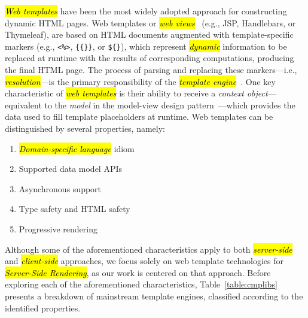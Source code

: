 \documentclass[software,article,accept,pdftex,moreauthors]{Definitions/mdpi}
\begin{document}
\textit{\hl{Web templates}} have been the most widely adopted approach for
constructing dynamic HTML pages.
Web templates or \textit{\hl{web views}}~\cite{Fowler02,Alur01} (e.g., JSP, Handlebars,
or Thymeleaf), are based on HTML documents augmented with template-specific
markers (e.g., \texttt{<\%>}, \texttt{\{\{\}\}}, or \texttt{\$\{\}}), which
represent \textit{\hl{dynamic}} information to be replaced at runtime with the
results of corresponding computations, producing the final HTML page.
The process of parsing and replacing these markers---i.e.,
\textit{\hl{resolution}}---is the primary responsibility of the \textit{\hl{template
  engine}}~\cite{Parr04}.
One key characteristic of \textit{\hl{web templates}} is their ability to receive a
\textit{context object}---equivalent to the \textit{model} in the model-view
design pattern~\cite{mvc88,Parr04}---which provides the data used to fill
template placeholders at runtime.
Web templates can be distinguished by several properties, namely:
\begin{enumerate}
  \item \textit{\hl{Domain-specific language}} idiom
  \item Supported data model APIs
  \item Asynchronous support
  \item Type safety and HTML safety
  \item Progressive rendering
\end{enumerate}

Although some of the aforementioned characteristics apply to both
\textit{\hl{server-side}} and \textit{\hl{client-side}} approaches, we focus solely on
web template technologies for \textit{\hl{Server-Side Rendering}}, as our work is
centered on that approach. Before exploring each of the aforementioned
characteristics, Table~\ref{table:cmplibs} presents a breakdown of mainstream
template engines, classified according to the identified properties.
\end{document}
